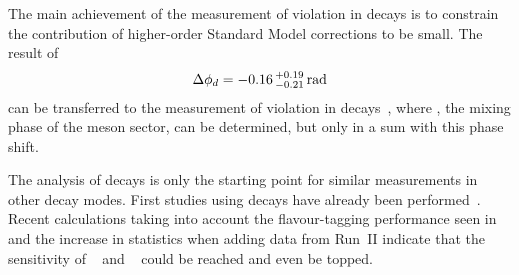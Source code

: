 The main achievement of the measurement of \CP violation in \BdToDD decays is
to constrain the contribution of higher-order Standard Model corrections to be
small. The result of
\begin{align*}
	\Delta {\ensuremath{\phi_{{d}}}} = -0.16\,^{+0.19}_{-0.21}\,\si{\radian}
\end{align*}
can be transferred to the measurement of \CP violation in \BsToDsDs
decays~\cite{LHCb-PAPER-2014-051}, where \phis, the mixing phase of the \Bs
meson sector, can be determined, but only in a sum with this phase shift.

The analysis of \BdToDD decays is only the starting point for similar
measurements in other \allBToDD decay modes. First studies using \BdToDstD
decays have already been performed~\cite{BToDstDthesis}. Recent calculations
taking into account the flavour-tagging performance seen in \BdToDD and the
increase in statistics when adding data from Run~II indicate that the
sensitivity of \babar~\cite{Aubert:2008ah} and \belle~\cite{Rohrken:2012ta}
could be reached and even be topped.

